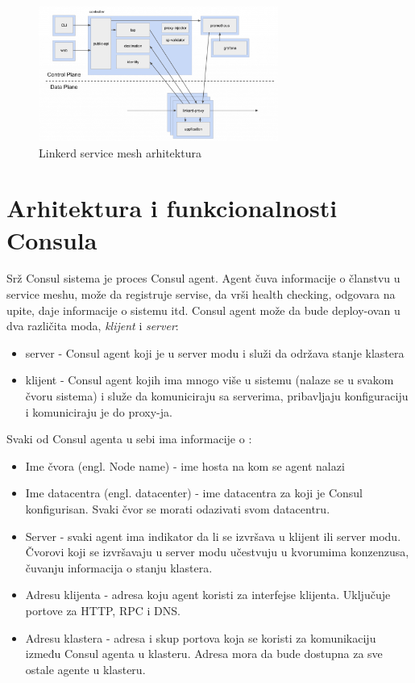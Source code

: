 \documentclass[a4paper,12pt]{report}
\begin{document}
\begin{figure}[h]
    \centering
    \includegraphics[width=0.7\textwidth]{linkerd_architecture}
    \caption{Linkerd service mesh arhitektura}
    \label{fig:linkerd-architecture}
\end{figure}


\section{Arhitektura i funkcionalnosti Consula}

Srž Consul sistema je proces Consul agent. Agent čuva informacije o članstvu u service meshu, može da registruje servise, da vrši health checking, odgovara na upite, daje informacije o sistemu itd. Consul agent može da bude deploy-ovan u dva različita moda, \textit{klijent} i \textit{server}: 

\begin{itemize}
	\item server - Consul agent koji je u server modu i služi da održava stanje klastera
	\item klijent - Consul agent kojih ima mnogo više u sistemu (nalaze se u svakom čvoru sistema) i služe da komuniciraju sa serverima, pribavljaju konfiguraciju i komuniciraju je do proxy-ja. 
\end{itemize}

Svaki od Consul agenta u sebi ima informacije o : 

\begin{itemize}
	\item Ime čvora (engl. Node name) - ime hosta na kom se agent nalazi
	\item Ime datacentra (engl. datacenter) - ime datacentra za koji je Consul konfigurisan. Svaki čvor se morati odazivati svom datacentru. 
	\item Server - svaki agent ima indikator da li se izvršava u klijent ili server modu. Čvorovi koji se izvršavaju u server modu učestvuju u kvorumima konzenzusa, čuvanju informacija o stanju klastera. 
	\item Adresu klijenta - adresa koju agent koristi za interfejse klijenta. Uključuje portove za HTTP, RPC i DNS. 
	\item Adresu klastera - adresa i skup portova koja se koristi za komunikaciju između Consul agenta u klasteru. Adresa mora da bude dostupna za sve ostale agente u klasteru.
\end{itemize}
\end{document}
